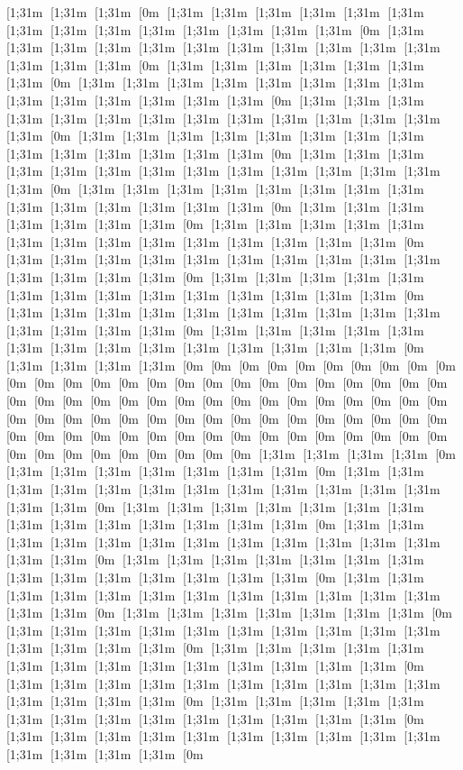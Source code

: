 [1;31m [1;31m [1;31m [0m [1;31m [1;31m [1;31m [1;31m [1;31m [1;31m [1;31m [1;31m [1;31m [1;31m [1;31m [1;31m [1;31m [1;31m [0m [1;31m [1;31m [1;31m [1;31m [1;31m [1;31m [1;31m [1;31m [1;31m [1;31m [1;31m [1;31m [1;31m [1;31m [0m [1;31m [1;31m [1;31m [1;31m [1;31m [1;31m [1;31m [0m [1;31m [1;31m [1;31m [1;31m [1;31m [1;31m [1;31m [1;31m [1;31m [1;31m [1;31m [1;31m [1;31m [1;31m [0m [1;31m [1;31m [1;31m [1;31m [1;31m [1;31m [1;31m [1;31m [1;31m [1;31m [1;31m [1;31m [1;31m [1;31m [0m [1;31m [1;31m [1;31m [1;31m [1;31m [1;31m [1;31m [1;31m [1;31m [1;31m [1;31m [1;31m [1;31m [1;31m [0m [1;31m [1;31m [1;31m [1;31m [1;31m [1;31m [1;31m [1;31m [1;31m [1;31m [1;31m [1;31m [1;31m [1;31m [0m [1;31m [1;31m [1;31m [1;31m [1;31m [1;31m [1;31m [1;31m [1;31m [1;31m [1;31m [1;31m [1;31m [1;31m [0m [1;31m [1;31m [1;31m [1;31m [1;31m [1;31m [1;31m [0m [1;31m [1;31m [1;31m [1;31m [1;31m [1;31m [1;31m [1;31m [1;31m [1;31m [1;31m [1;31m [1;31m [1;31m [0m [1;31m [1;31m [1;31m [1;31m [1;31m [1;31m [1;31m [1;31m [1;31m [1;31m [1;31m [1;31m [1;31m [1;31m [0m [1;31m [1;31m [1;31m [1;31m [1;31m [1;31m [1;31m [1;31m [1;31m [1;31m [1;31m [1;31m [1;31m [1;31m [0m [1;31m [1;31m [1;31m [1;31m [1;31m [1;31m [1;31m [1;31m [1;31m [1;31m [1;31m [1;31m [1;31m [1;31m [0m [1;31m [1;31m [1;31m [1;31m [1;31m [1;31m [1;31m [1;31m [1;31m [1;31m [1;31m [1;31m [1;31m [1;31m [0m [1;31m [1;31m [1;31m [1;31m [0m [0m [0m [0m [0m [0m [0m [0m [0m [0m [0m [0m [0m [0m [0m [0m [0m [0m [0m [0m [0m [0m [0m [0m [0m [0m [0m [0m [0m [0m [0m [0m [0m [0m [0m [0m [0m [0m [0m [0m [0m [0m [0m [0m [0m [0m [0m [0m [0m [0m [0m [0m [0m [0m [0m [0m [0m [0m [0m [0m [0m [0m [0m [0m [0m [0m [0m [0m [0m [0m [0m [0m [0m [0m [0m [0m [0m [0m [0m [0m [0m [0m [0m [1;31m [1;31m [1;31m [1;31m [0m [1;31m [1;31m [1;31m [1;31m [1;31m [1;31m [1;31m [0m [1;31m [1;31m [1;31m [1;31m [1;31m [1;31m [1;31m [1;31m [1;31m [1;31m [1;31m [1;31m [1;31m [1;31m [0m [1;31m [1;31m [1;31m [1;31m [1;31m [1;31m [1;31m [1;31m [1;31m [1;31m [1;31m [1;31m [1;31m [1;31m [0m [1;31m [1;31m [1;31m [1;31m [1;31m [1;31m [1;31m [1;31m [1;31m [1;31m [1;31m [1;31m [1;31m [1;31m [0m [1;31m [1;31m [1;31m [1;31m [1;31m [1;31m [1;31m [1;31m [1;31m [1;31m [1;31m [1;31m [1;31m [1;31m [0m [1;31m [1;31m [1;31m [1;31m [1;31m [1;31m [1;31m [1;31m [1;31m [1;31m [1;31m [1;31m [1;31m [1;31m [0m [1;31m [1;31m [1;31m [1;31m [1;31m [1;31m [1;31m [0m [1;31m [1;31m [1;31m [1;31m [1;31m [1;31m [1;31m [1;31m [1;31m [1;31m [1;31m [1;31m [1;31m [1;31m [0m [1;31m [1;31m [1;31m [1;31m [1;31m [1;31m [1;31m [1;31m [1;31m [1;31m [1;31m [1;31m [1;31m [1;31m [0m [1;31m [1;31m [1;31m [1;31m [1;31m [1;31m [1;31m [1;31m [1;31m [1;31m [1;31m [1;31m [1;31m [1;31m [0m [1;31m [1;31m [1;31m [1;31m [1;31m [1;31m [1;31m [1;31m [1;31m [1;31m [1;31m [1;31m [1;31m [1;31m [0m [1;31m [1;31m [1;31m [1;31m [1;31m [1;31m [1;31m [1;31m [1;31m [1;31m [1;31m [1;31m [1;31m [1;31m [0m 